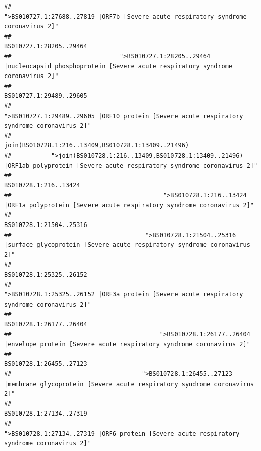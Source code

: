 \documentclass[
]{article}
\begin{document}
\begin{verbatim}
##                                                    ">BS010727.1:27688..27819 |ORF7b [Severe acute respiratory syndrome coronavirus 2]" 
##                                                                                                                BS010727.1:28205..29464 
##                              ">BS010727.1:28205..29464 |nucleocapsid phosphoprotein [Severe acute respiratory syndrome coronavirus 2]" 
##                                                                                                                BS010727.1:29489..29605 
##                                            ">BS010727.1:29489..29605 |ORF10 protein [Severe acute respiratory syndrome coronavirus 2]" 
##                                                                                    join(BS010728.1:216..13409,BS010728.1:13409..21496) 
##           ">join(BS010728.1:216..13409,BS010728.1:13409..21496) |ORF1ab polyprotein [Severe acute respiratory syndrome coronavirus 2]" 
##                                                                                                                  BS010728.1:216..13424 
##                                          ">BS010728.1:216..13424 |ORF1a polyprotein [Severe acute respiratory syndrome coronavirus 2]" 
##                                                                                                                BS010728.1:21504..25316 
##                                     ">BS010728.1:21504..25316 |surface glycoprotein [Severe acute respiratory syndrome coronavirus 2]" 
##                                                                                                                BS010728.1:25325..26152 
##                                            ">BS010728.1:25325..26152 |ORF3a protein [Severe acute respiratory syndrome coronavirus 2]" 
##                                                                                                                BS010728.1:26177..26404 
##                                         ">BS010728.1:26177..26404 |envelope protein [Severe acute respiratory syndrome coronavirus 2]" 
##                                                                                                                BS010728.1:26455..27123 
##                                    ">BS010728.1:26455..27123 |membrane glycoprotein [Severe acute respiratory syndrome coronavirus 2]" 
##                                                                                                                BS010728.1:27134..27319 
##                                             ">BS010728.1:27134..27319 |ORF6 protein [Severe acute respiratory syndrome coronavirus 2]" 

\end{verbatim}
\end{document}
